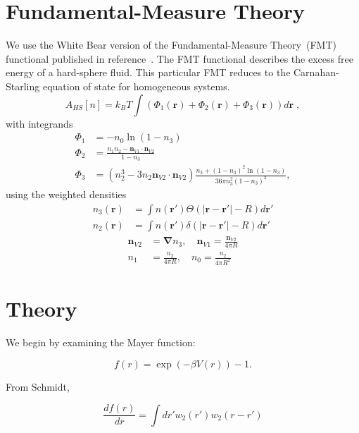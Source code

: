 \documentclass[letterpaper,twocolumn,amsmath,amssymb,prb]{revtex4-1}
\newcommand{\rr}{\textbf{r}}
\begin{document}
\section{Fundamental-Measure Theory}

We use the White Bear version of the Fundamental-Measure Theory~(FMT)
functional published in reference~\cite{roth2002whitebear}.  The FMT
functional describes the excess free energy of a hard-sphere fluid.
This particular FMT reduces to the Carnahan-Starling equation of state
for homogeneous systems.
\begin{equation}
A_\textit{HS}[n] = k_B T \int \left(\Phi_1(\rr) + \Phi_2(\rr) + \Phi_3(\rr)\right) d\rr \; ,
\end{equation}
with integrands
\begin{align}
\Phi_1 &= -n_0 \ln\left( 1 - n_3\right)\\
\Phi_2 &= \frac{n_1 n_2 - \mathbf{n}_{V1} \cdot\mathbf{n}_{V2}}{1-n_3} \\
\Phi_3 &= (n_2^3 - 3 n_2 \mathbf{n}_{V2} \cdot \mathbf{n}_{V2}) \frac{
  n_3 + (1-n_3)^2 \ln(1-n_3)
}{
  36\pi n_3^2\left( 1 - n_3 \right)^2
} ,
\end{align}
using the weighted densities
\begin{align}
  n_3(\rr) &= \int n(\rr') \Theta(\left|\rr - \rr'\right| - R) d\rr' \\
  n_2(\rr) &= \int n(\rr') \delta(\left|\rr - \rr'\right| - R) d\rr'
\end{align}
\begin{align}
  \mathbf{n}_{V2} &= \mathbf{\nabla} n_3 , \quad
  \mathbf{n}_{V1} = \frac{\mathbf{n}_{V2}}{4\pi R} \\
  n_1 &= \frac{n_2}{4\pi R} , \quad
  n_0 = \frac{n_2}{4\pi R^2}
\end{align}

\section{Theory}

We begin by examining the Mayer function:

\begin{equation}
f(r) = \exp (-\beta V(r)) - 1.
\end{equation}

From Schmidt\cite{schmidt2000fluid},

\begin{equation}\label{eq:mayerandw2}
\frac{d f(r)}{dr} = \int dr' w_2(r') w_2 (r-r')
\end{equation}
\end{document}
